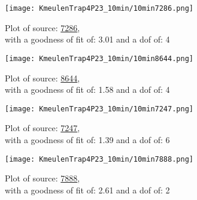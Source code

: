 \documentclass{article}
\begin{document}
\begin{figure}[H]
    \centering
    \begin{minipage}{.5\textwidth}
        \centering
        \texttt{[image: KmeulenTrap4P23\_10min/10min7286.png]}
        \captionsetup{labelformat=empty}
        \caption{Plot of source: \href{http://banana.transientskp.org/r4/vlo_KmeulenTrap4P23/runningcatalog/7286}{7286},\\with a goodness of fit of: 3.01 and a dof of: 4}
        \addtocounter{figure}{-1}
        \label{KmeulenTrap4P23:10min:7286:plot}
    \end{minipage}%
    \begin{minipage}{0.5\textwidth}
        \centering

        \texttt{[image: KmeulenTrap4P23\_10min/10min8644.png]}
        \captionsetup{labelformat=empty}
        \caption{Plot of source: \href{http://banana.transientskp.org/r4/vlo_KmeulenTrap4P23/runningcatalog/8644}{8644},\\with a goodness of fit of: 1.58 and a dof of: 4}
    \addtocounter{figure}{-1}
    \label{KmeulenTrap4P23:10min:8644:plot}
    \end{minipage}
\end{figure}
\begin{figure}[H]
    \centering
    \begin{minipage}{.5\textwidth}
        \centering
        \texttt{[image: KmeulenTrap4P23\_10min/10min7247.png]}
        \captionsetup{labelformat=empty}
        \caption{Plot of source: \href{http://banana.transientskp.org/r4/vlo_KmeulenTrap4P23/runningcatalog/7247}{7247},\\with a goodness of fit of: 1.39 and a dof of: 6}
        \addtocounter{figure}{-1}
        \label{KmeulenTrap4P23:10min:7247:plot}
    \end{minipage}%
    \begin{minipage}{0.5\textwidth}
        \centering

        \texttt{[image: KmeulenTrap4P23\_10min/10min7888.png]}
        \captionsetup{labelformat=empty}
        \caption{Plot of source: \href{http://banana.transientskp.org/r4/vlo_KmeulenTrap4P23/runningcatalog/7888}{7888},\\with a goodness of fit of: 2.61 and a dof of: 2}
    \addtocounter{figure}{-1}
    \label{KmeulenTrap4P23:10min:7888:plot}
    \end{minipage}
\end{figure}
\newpage
\end{document}
